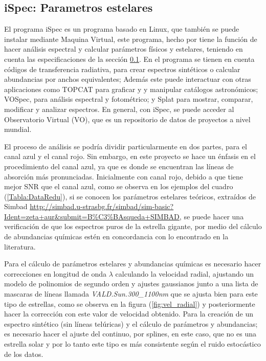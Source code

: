 \documentclass[12pt,oneside,openany,letter]{book}
\begin{document}
\subsection{iSpec: Parametros estelares}
\label{sec:para_est}

\noindent El programa iSpec es un programa basado en Linux, que también se puede instalar mediante Maquina Virtual, este programa, hecho por \citep{blanco2014determining} tiene la función de hacer análisis espectral y calcular parámetros físicos y estelares, teniendo en cuenta las especificaciones de la sección \ref{sec:para_est}. En el programa se tienen en cuenta códigos de transferencia radiativa, para crear espectros sintéticos o calcular abundancias por anchos equivalentes; Además este puede interactuar con otras aplicaciones como TOPCAT para graficar y y manipular catálogos astronómicos; VOSpec, para análisis espectral y fotométrico; y Splat para mostrar, comparar, modificar y analizar espectros. En general, con iSpec, se puede acceder al Observatorio Virtual (VO), que es un repositorio de datos de proyectos a nivel mundial.
\vspace{2mm}

\noindent El proceso de análisis se podría dividir particularmente en dos partes, para el canal azul y el canal rojo. Sin embargo, en este proyecto se hace un énfasis en el procedimiento del canal azul, ya que es donde se encuentran las líneas de absorción más pronunciadas. Inicialmente con canal rojo, debido a que tiene mejor SNR que el canal azul, como se observa en los ejemplos del cuadro (\ref{Tabla:DataRedu}), si se conocen los parámetros estelares teóricos, extraídos de Simbad \url{http://simbad.u-strasbg.fr/simbad/sim-basic?Ident=zeta+aur&submit=B\%C3\%BAsqueda+SIMBAD}, se puede hacer una verificación de que los espectros puros de la estrella gigante, por medio del cálculo de abundancias químicas estén en concordancia con lo encontrado en la literatura.

\noindent Para el cálculo de parámetros estelares y abundancias químicas es necesario hacer correcciones en longitud de onda $\lambda$ calculando la velocidad radial, ajustando un modelo de polinomios de segundo orden y ajustes gaussianos junto a una lista de mascaras de líneas llamada \textit{VALD.Sun.300\_1100nm} que se ajusta bien para este tipo de estrellas, como se observa en la figura (\ref{fig:vel_radial}) y posteriormente hacer la corrección con este valor de velocidad obtenido. Para la creación de un espectro sintético (sin líneas telúricas) y el cálculo de parámetros y abundancias; es necesario hacer el ajuste del continuo, por splines, en este caso, que no es una estrella solar y por lo tanto este tipo es más consistente según el ruido estocástico de los datos.
\end{document}

